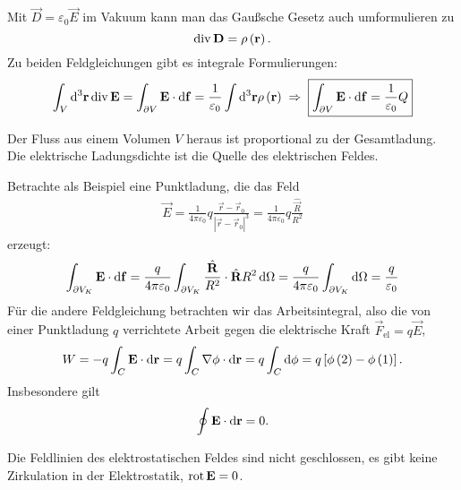 Mit $\vec {D}=\varepsilon _{0}\vec {E}$ im Vakuum kann man das Gaußsche Gesetz auch umformulieren zu
\begin{equation}
	\label{3.6}
	\operatorname{div} \mathbf{D}=\rho \left(\mathbf{r}\right).
\end{equation}
Zu beiden Feldgleichungen gibt es integrale Formulierungen:
\begin{equation*}
	\int _{V}\mathop{}\!\mathrm{d} ^{3}\mathbf{r}\operatorname{div} \mathbf{E}=\int _{\partial V}\mathbf{E}\cdot \mathop{}\!\mathrm{d} \mathbf{f}=\frac{1}{\varepsilon _{0}}\int \mathop{}\!\mathrm{d} ^{3}\mathbf{r}\rho \left(\mathbf{r}\right)\;\Rightarrow\; \boxed{\int _{\partial V}\mathbf{E}\cdot \mathop{}\!\mathrm{d} \mathbf{f}=\frac{1}{\varepsilon _{0}}Q}
\end{equation*}
\begin{formal}
	Der Fluss aus einem Volumen $V$ heraus ist proportional zu der Gesamtladung. Die elektrische Ladungsdichte ist die Quelle des elektrischen Feldes.
\end{formal}
Betrachte als Beispiel eine Punktladung, die das Feld
\begin{align*}
	\vec {E}=\frac{1}{4\pi \varepsilon _{0}}q\frac{\vec {r}-\vec {r}_{0}}{\left| \vec {r}-\vec {r}_{0}\right| ^{3}}=\frac{1}{4\pi \varepsilon _{0}}q\frac{\hat{\vec {R}}}{R^{2}}
\end{align*}
erzeugt:
\begin{equation*}
	\int _{\partial V_{K}}\mathbf{E}\cdot \mathop{}\!\mathrm{d} \mathbf{f}=\frac{q}{4\pi \varepsilon _{0}}\int _{\partial V_{K}}\frac{\hat{\mathbf{R}}}{R^{2}}\cdot \hat{\mathbf{R}}R^{2}\mathop{}\!\mathrm{d} \Omega  =\frac{q}{4\pi \varepsilon _{0}}\int _{\partial V_{K}}\mathop{}\!\mathrm{d} \Omega  =\frac{q}{\varepsilon _{0}}
\end{equation*}
Für die andere Feldgleichung betrachten wir das Arbeitsintegral, also die von einer Punktladung $q$ verrichtete Arbeit gegen die elektrische Kraft $\vec F_{\mathrm{el}}=q\vec {E}$,
\begin{equation*}
	W=-q\int _{C}\mathbf{E}\cdot \mathop{}\!\mathrm{d} \mathbf{r}=q\int _{C}\nabla \phi \cdot \mathop{}\!\mathrm{d} \mathbf{r}=q\int _{C}\mathop{}\!\mathrm{d} \phi =q\left[\phi \left(2\right)-\phi \left(1\right)\right].
\end{equation*}
Insbesondere gilt
\begin{equation}
	\label{3.7}
	\oint \mathbf{E}\cdot \mathop{}\!\mathrm{d} \mathbf{r}=0.
\end{equation}

\begin{formal}
	Die Feldlinien des elektrostatischen Feldes sind nicht geschlossen, es gibt keine Zirkulation in der Elektrostatik, $\operatorname{rot} \mathbf{E}=0$.
\end{formal}



